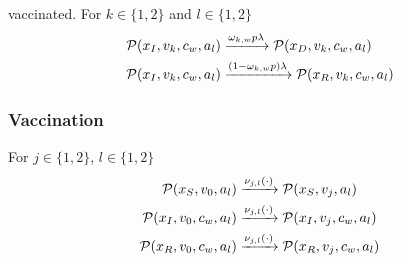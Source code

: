 vaccinated. For $k \in \{1,2\}$ and $l \in \{1,2\}$
\begin{align}
    \mathcal{P}(x_I,  v_k, c_w, a_l) &\xrightarrow{\omega_{k,w} p \lambda} \mathcal{P}(x_D,  v_k, c_w, a_l) \notag \\
\mathcal{P}(x_I,  v_k, c_w, a_l) &\xrightarrow{(1-\omega_{k,w}p) \lambda} \mathcal{P}(x_R,  v_k, c_w, a_l) \notag 
\end{align}

\subsubsection*{Vaccination}
For $j \in \{1,2\}$, $l \in \{1,2\}$
\begin{align*}
\mathcal{P}(x_S, v_0, a_l) &\xrightarrow{\nu_{j,l}(\cdot)} \mathcal{P}(x_S, v_j, a_l) \notag \\
\mathcal{P}(x_I, v_0, c_w, a_l) &\xrightarrow{\nu_{j,l}(\cdot)} \mathcal{P}(x_I, v_j, c_w, a_l) \notag \\
\mathcal{P}(x_R, v_0, c_w, a_l) &\xrightarrow{\nu_{j,l}(\cdot)} \mathcal{P}(x_R, v_j, c_w, a_l)
\end{align*}



